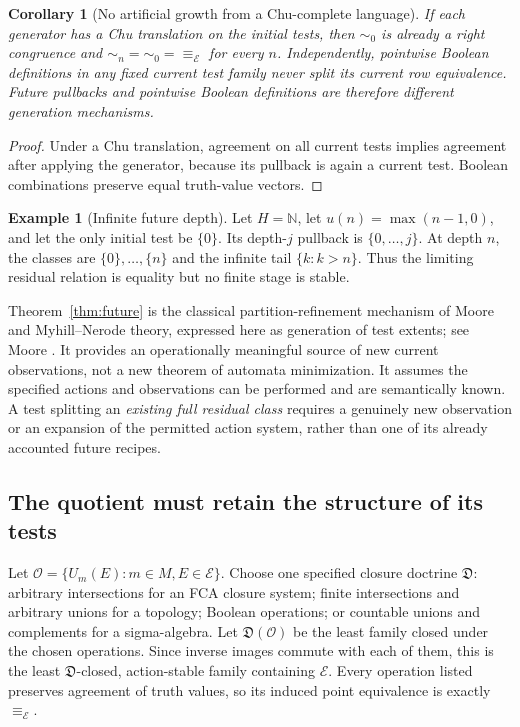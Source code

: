 \documentclass[11pt]{article}
\newtheorem{corollary}[theorem]{Corollary}
\theoremstyle{definition}
\newtheorem{example}[theorem]{Example}
\begin{document}
\begin{corollary}[No artificial growth from a Chu-complete language]
If each generator has a Chu translation on the initial tests, then
$\sim_0$ is already a right congruence and
$\sim_n=\sim_0=\equiv_{\mathcal E}$ for every $n$. Independently,
pointwise Boolean definitions in any fixed current test family never
split its current row equivalence. Future pullbacks and pointwise Boolean
definitions are therefore different generation mechanisms.
\end{corollary}
\begin{proof}
Under a Chu translation, agreement on all current tests implies agreement
after applying the generator, because its pullback is again a current
test. Boolean combinations preserve equal truth-value vectors.
\end{proof}

\begin{example}[Infinite future depth]
Let $H=\mathbb N$, let $u(n)=\max(n-1,0)$, and let the only initial test
be $\{0\}$. Its depth-$j$ pullback is $\{0,\ldots,j\}$. At depth $n$,
the classes are $\{0\},\ldots,\{n\}$ and the infinite tail
$\{k:k>n\}$. Thus the limiting residual relation is equality but no
finite stage is stable.
\end{example}

Theorem~\ref{thm:future} is the classical partition-refinement mechanism
of Moore and Myhill--Nerode theory, expressed here as generation of test
extents; see Moore \cite{Moore}. It provides an operationally meaningful
source of new current observations, not a new theorem of automata
minimization. It assumes the specified actions and observations can be
performed and are semantically known. A test splitting an \emph{existing
full residual class} requires a genuinely new observation or an expansion
of the permitted action system, rather than one of its already accounted
future recipes.

\subsection{The quotient must retain the structure of its tests}

Let $\mathcal O=\{U_m(E):m\in M,E\in\mathcal E\}$. Choose one
specified closure doctrine $\mathfrak D$: arbitrary intersections for an
FCA closure system; finite intersections and arbitrary unions for a topology;
Boolean operations; or countable unions and complements for a sigma-algebra.
Let $\mathfrak D(\mathcal O)$ be the least family closed under the chosen
operations. Since inverse images commute with each of them, this is the least
$\mathfrak D$-closed, action-stable family containing $\mathcal E$.
Every operation listed preserves agreement of truth values, so its induced
point equivalence is exactly $\equiv_{\mathcal E}$.
\end{document}
